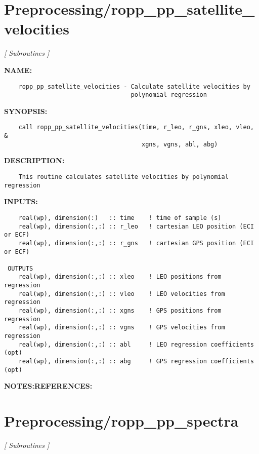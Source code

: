 \section{Preprocessing/ropp\_pp\_satellite\_velocities}
\textsl{[ Subroutines ]}

\label{ch:robo85}
\label{ch:Preprocessing_ropp_pp_satellite_velocities}
\textbf{NAME:}\hspace{0.08in}\begin{Verbatim}
    ropp_pp_satellite_velocities - Calculate satellite velocities by
                                   polynomial regression
\end{Verbatim}
\textbf{SYNOPSIS:}\hspace{0.08in}\begin{Verbatim}
    call ropp_pp_satellite_velocities(time, r_leo, r_gns, xleo, vleo,    &
                                      xgns, vgns, abl, abg)
\end{Verbatim}
\textbf{DESCRIPTION:}\hspace{0.08in}\begin{Verbatim}
    This routine calculates satellite velocities by polynomial regression
\end{Verbatim}
\textbf{INPUTS:}\hspace{0.08in}\begin{Verbatim}
    real(wp), dimension(:)   :: time    ! time of sample (s)
    real(wp), dimension(:,:) :: r_leo   ! cartesian LEO position (ECI or ECF)
    real(wp), dimension(:,:) :: r_gns   ! cartesian GPS position (ECI or ECF)

 OUTPUTS
    real(wp), dimension(:,:) :: xleo    ! LEO positions from regression
    real(wp), dimension(:,:) :: vleo    ! LEO velocities from regression
    real(wp), dimension(:,:) :: xgns    ! GPS positions from regression
    real(wp), dimension(:,:) :: vgns    ! GPS velocities from regression
    real(wp), dimension(:,:) :: abl     ! LEO regression coefficients (opt)
    real(wp), dimension(:,:) :: abg     ! GPS regression coefficients (opt)
\end{Verbatim}
\textbf{NOTES:}\hspace{0.08in}\textbf{REFERENCES:}\hspace{0.08in}\section{Preprocessing/ropp\_pp\_spectra}
\textsl{[ Subroutines ]}


